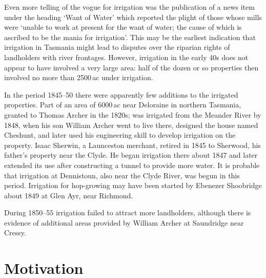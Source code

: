 Even more telling of the vogue for irrigation was the publication of a
news item under the heading `Want of Water' which reported the plight
of those whose mills were `unable to work at present for the want of
water; the cause of which is ascribed to be the mania for
irrigation'.  This may
be the earliest indication that irrigation in Tasmania might lead to
disputes over the riparian rights of landholders with river frontages.
However, irrigation in the early 40s does not appear to have involved
a very large area: half of the dozen or so properties then involved no
more than 2500\,ac under irrigation.

In the period 1845--50 there were apparently few additions to the
irrigated properties.  Part of an area of 6000\,ac near Deloraine in
northern Tasmania, granted to Thomas Archer in the 1820s; was
irrigated from the Meander River by 1848, when his son William Archer
went to live there, designed the house named Cheshunt, and later used
his engineering skill to develop irrigation on the property.  Isaac
Sherwin, a Launceston merchant, retired in 1845 to Sherwood, his
father's property near the Clyde.  He began irrigation there about
1847 and later extended its use after constructing a tunnel to provide
more water.  It is probable that irrigation at Dennistoun, also near
the Clyde River, was begun in this period.  Irrigation for hop-growing
may have been started by Ebenezer Shoobridge about 1849 at Glen Ayr,
near Richmond.

During 1850--55 irrigation failed to attract more landholders,
although there is evidence of additional areas provided by William
Archer at Saundridge near Cressy.\fn{\citet[p.\,30]{masoncox1994}.}

\section*{Motivation}

